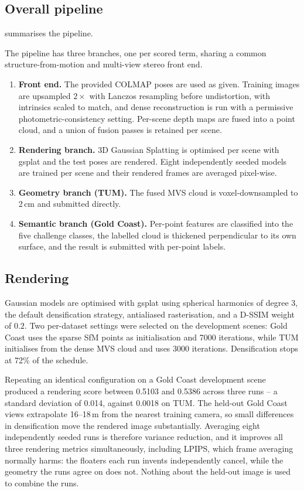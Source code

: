 \documentclass[10pt,twocolumn,letterpaper]{article}
\begin{document}
\subsection{Overall pipeline}

 summarises the pipeline.

The pipeline has three branches, one per scored term, sharing a common
structure-from-motion and multi-view stereo front end.

\begin{enumerate}[1.]\itemsep2pt
\item \textbf{Front end.} The provided COLMAP poses are used as given. Training
images are upsampled $2\times$ with Lanczos resampling before undistortion, with
intrinsics scaled to match, and dense reconstruction is run with a permissive
photometric-consistency setting. Per-scene depth maps are fused into a point
cloud, and a union of fusion passes is retained per scene.

\item \textbf{Rendering branch.} 3D Gaussian Splatting is optimised per scene
with gsplat and the test poses are rendered. Eight independently seeded models
are trained per scene and their rendered frames are averaged pixel-wise.

\item \textbf{Geometry branch (TUM).} The fused MVS cloud is voxel-downsampled
to 2\,cm and submitted directly.

\item \textbf{Semantic branch (Gold Coast).} Per-point features are classified
into the five challenge classes, the labelled cloud is thickened perpendicular to
its own surface, and the result is submitted with per-point labels.
\end{enumerate}

\subsection{Rendering}

Gaussian models are optimised with gsplat using spherical harmonics of degree 3,
the default densification strategy, antialiased rasterisation, and a
D-SSIM weight of $0.2$. Two per-dataset settings were selected on the
development scenes: Gold Coast uses the sparse SfM points as initialisation and
7000 iterations, while TUM initialises from the dense MVS cloud and uses 3000
iterations. Densification stops at 72\% of the schedule.

Repeating an identical configuration on a Gold Coast development scene produced
a rendering score between 0.5103 and 0.5386 across three runs -- a standard
deviation of 0.014, against 0.0018 on TUM. The held-out Gold Coast views
extrapolate 16--18\,m from the nearest training camera, so small differences in
densification move the rendered image substantially. Averaging eight
independently seeded runs is therefore variance reduction, and it improves all
three rendering metrics simultaneously, including LPIPS, which frame averaging
normally harms: the floaters each run invents independently cancel, while the
geometry the runs agree on does not. Nothing about the held-out image is used to
combine the runs.
\end{document}
